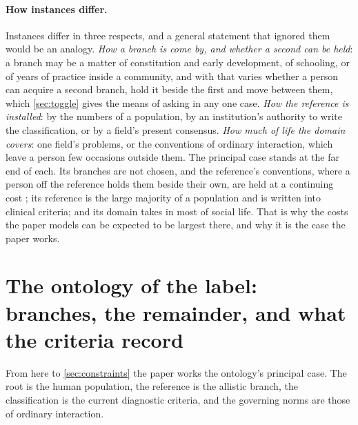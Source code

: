 \paragraph{How instances differ.} Instances differ in three respects, and a general statement that ignored them would be an analogy. \emph{How a branch is come by, and whether a second can be held}: a branch may be a matter of constitution and early development, of schooling, or of years of practice inside a community, and with that varies whether a person can acquire a second branch, hold it beside the first and move between them, which \autoref{sec:toggle} gives the means of asking in any one case. \emph{How the reference is installed}: by the numbers of a population, by an institution's authority to write the classification, or by a field's present consensus. \emph{How much of life the domain covers}: one field's problems, or the conventions of ordinary interaction, which leave a person few occasions outside them. The principal case stands at the far end of each. Its branches are not chosen, and the reference's conventions, where a person off the reference holds them beside their own, are held at a continuing cost \cite{Hull2017, Pearson2021}; its reference is the large majority of a population and is written into clinical criteria; and its domain takes in most of social life. That is why the costs the paper models can be expected to be largest there, and why it is the case the paper works.

\section{The ontology of the label: branches, the remainder, and what the criteria record}
\label{sec:labels}

From here to \autoref{sec:constraints} the paper works the ontology's principal case. The root is the human population, the reference is the allistic branch, the classification is the current diagnostic criteria, and the governing norms are those of ordinary interaction.


